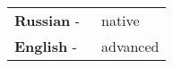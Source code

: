 \documentclass{ncv}
\begin{document}
\begin{tabular}{ l l }
\textbf{Russian} - & \ native\\ 
\textbf{English} - & \ advanced    
\end{tabular}
%	
%	
%	
%	
%
%	
\end{document}

